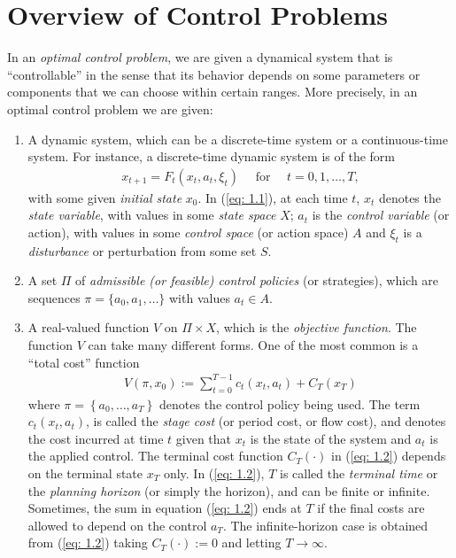 \documentclass[\topdir/lecture\_notes.tex]{subfiles}
\begin{document}
\section{Overview of Control Problems}
In an \emph{optimal control problem}, we are given a dynamical system that is ``controllable'' in the sense that its behavior depends on some parameters or components that we can choose within certain ranges. More precisely, in an optimal control problem we are given:
\begin{enumerate}
  \item A dynamic system, which can be a discrete-time system or a continuous-time system. For instance, a discrete-time dynamic system is of the form
  \begin{align}
    x_{t+1}=F_{t}(x_{t}, a_{t}, \xi_{t}) \quad \text { for } \quad t=0,1, \ldots, T , \label{eq: 1.1}
  \end{align}
  with some given \emph{initial state} $x_{0}$. In (\ref{eq: 1.1}), at each time $t$, $x_{t}$ denotes the \emph{state variable}, with values in some \emph{state space} $X$; $a_{t}$ is the \emph{control variable} (or action), with values in some \emph{control space} (or action space) $A$ and $\xi_{t}$ is a \emph{disturbance} or perturbation from some set $S$. 
    
  \item A set $\Pi$ of \emph{admissible (or feasible) control policies} (or strategies), which are sequences $\pi=\{a_{0}, a_{1}, \ldots\}$ with values $a_{t} \in A$.

  \item A real-valued function $V$ on $\Pi \times X$, which is the \emph{objective function}. The function $V$ can take many different forms. One of the most common is a ``total cost'' function
  \begin{align}
    V(\pi, x_{0}):=\sum_{t=0}^{T-1} c_{t}(x_{t}, a_{t})+C_{T}(x_{T}) \label{eq: 1.2}
  \end{align}
  where $\pi=\left\{a_{0}, \ldots, a_{T}\right\}$ denotes the control policy being used. The term $c_{t}(x_{t}, a_{t})$, is called the \emph{stage cost} (or period cost, or flow cost), and denotes the cost incurred at time $t$ given that $x_{t}$ is the state of the system and $a_{t}$ is the applied control. The terminal cost function $C_{T}(\cdot)$ in (\ref{eq: 1.2}) depends on the terminal state $x_{T}$ only. In (\ref{eq: 1.2}), $T$ is called the \emph{terminal time} or the \emph{planning horizon} (or simply the horizon), and can be finite or infinite. Sometimes, the sum in equation (\ref{eq: 1.2}) ends at $T$ if the final costs are allowed to depend on the control $a_T$. The infinite-horizon case is obtained from (\ref{eq: 1.2}) taking $C_{T}(\cdot) := 0$ and letting $T \rightarrow \infty$.
\end{enumerate}
\end{document}
